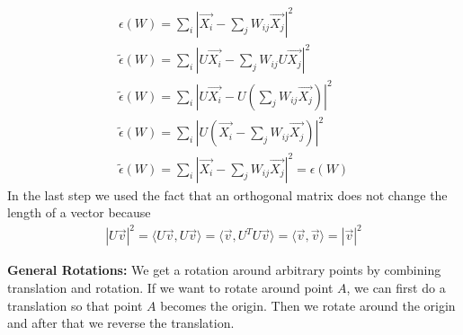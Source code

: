 \begin{gather*}
\epsilon(W) = \sum_{i} |\vec{X_{i}} - \sum_j W_{ij} \vec{X_{j}}| ^{2} \\
\tilde{\epsilon}(W) = \sum_{i} |U\vec{X_{i}} - \sum_j W_{ij} U\vec{X_{j}}| ^{2} \\
\tilde{\epsilon}(W) = \sum_{i} |U\vec{X_{i}} - U(\sum_j W_{ij} \vec{X_{j}})| ^{2} \\
\tilde{\epsilon}(W) = \sum_{i} |U(\vec{X_{i}} - \sum_j W_{ij} \vec{X_{j}})| ^{2} \\
\tilde{\epsilon}(W) = \sum_{i} |\vec{X_{i}} - \sum_j W_{ij} \vec{X_{j}}| ^{2} = \epsilon(W)
\end{gather*}
In the last step we used the fact that an orthogonal matrix does not change the length of a vector because
\begin{gather*}
|U\vec{v}|^2 = \langle U\vec{v}, U\vec{v}\rangle = \langle \vec{v}, U^T U\vec{v}\rangle = \langle \vec{v}, \vec{v}\rangle = |\vec{v}|^2
\end{gather*}

\textbf{General Rotations:} We get a rotation around arbitrary points by combining translation and rotation. If we want to rotate around point $A$, we can first do a translation so that point $A$ becomes the origin. Then we rotate around the origin and after that we reverse the translation.

\clearpage
